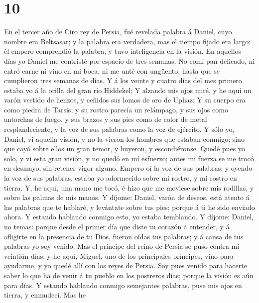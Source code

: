 \hypertarget{section-9}{%
\section{10}\label{section-9}}

 En el tercer año de Ciro rey de Persia, fué revelada
palabra á Daniel, cuyo nombre era Beltsasar; y la palabra era verdadera,
mas el tiempo fijado era largo: él empero comprendió la palabra, y tuvo
inteligencia en la visión.  En aquellos días yo Daniel me
contristé por espacio de tres semanas.  No comí pan
delicado, ni entró carne ni vino en mi boca, ni me unté con ungüento,
hasta que se cumplieron tres semanas de días.  Y á los
veinte y cuatro días del mes primero estaba yo á la orilla del gran río
Hiddekel;  Y alzando mis ojos miré, y he aquí un varón
vestido de lienzos, y ceñidos sus lomos de oro de Uphaz:  Y
su cuerpo era como piedra de Tarsis, y su rostro parecía un relámpago, y
sus ojos como antorchas de fuego, y sus brazos y sus pies como de color
de metal resplandeciente, y la voz de sus palabras como la voz de
ejército.  Y sólo yo, Daniel, vi aquella visión, y no la
vieron los hombres que estaban conmigo; sino que cayó sobre ellos un
gran temor, y huyeron, y escondiéronse.  Quedé pues yo solo,
y vi esta gran visión, y no quedó en mí esfuerzo; antes mi fuerza se me
trocó en desmayo, sin retener vigor alguno.  Empero oí la
voz de sus palabras: y oyendo la voz de sus palabras, estaba yo
adormecido sobre mi rostro, y mi rostro en tierra.  Y, he
aquí, una mano me tocó, é hizo que me moviese sobre mis rodillas, y
sobre las palmas de mis manos.  Y díjome: Daniel, varón de
deseos, está atento á las palabras que te hablaré, y levántate sobre tus
pies; porque á ti he sido enviado ahora. Y estando hablando conmigo
esto, yo estaba temblando.  Y díjome: Daniel, no temas:
porque desde el primer día que diste tu corazón á entender, y á
afligirte en la presencia de tu Dios, fueron oídas tus palabras; y á
causa de tus palabras yo soy venido.  Mas el príncipe del
reino de Persia se puso contra mí veintiún días: y he aquí, Miguel, uno
de los principales príncipes, vino para ayudarme, y yo quedé allí con
los reyes de Persia.  Soy pues venido para hacerte saber lo
que ha de venir á tu pueblo en los postreros días; porque la visión es
aún para días.  Y estando hablando conmigo semejantes
palabras, puse mis ojos en tierra, y enmudecí.  Mas he
